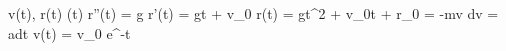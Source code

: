 v(t), r(t)
(t)
r''(t) = g
r'(t) = g\cdot t + v_0
r(t) =  \cdot gt^2 + v_0t + r_0
 = -m\rho v
dv = a\cdot dt
v(t) = v_0 \cdot e^{-\rho t}
